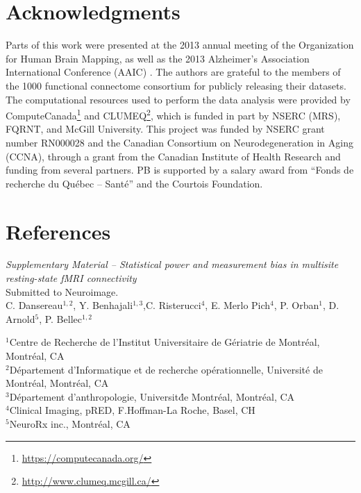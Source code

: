 \documentclass[authoryear]{elsarticle}
\begin{document}
\section{Acknowledgments}
Parts of this work were presented at the 2013 annual meeting of the Organization for Human Brain Mapping, as well as the 2013 Alzheimer's Association International Conference (AAIC) \citep{Dansereau2013b}. The authors are grateful to the members of the 1000 functional connectome consortium for publicly releasing their datasets. The computational resources used to perform the data analysis were provided by ComputeCanada\footnote{\url{https://computecanada.org/}} and CLUMEQ\footnote{\url{http://www.clumeq.mcgill.ca/}}, which is funded in part by NSERC (MRS), FQRNT, and McGill University. This project was funded by NSERC grant number RN000028 and the Canadian
Consortium on Neurodegeneration in Aging (CCNA), through a grant from
the Canadian Institute of Health Research and funding from several
partners. PB is supported by a salary award from ``Fonds de recherche du Qu\'ebec -- Sant\'e'' and the Courtois Foundation.

\section*{References}





\pagebreak



\clearpage
\appendix


\clearpage
\pagebreak
\renewcommand{\thefigure}{S\arabic{figure}}
\renewcommand{\thetable}{S\arabic{table}}
\setcounter{figure}{0}
\begin{center}
\emph{Supplementary Material {--} Statistical power and measurement bias in multisite resting-state fMRI connectivity}\\

\vspace{\baselineskip}Submitted to Neuroimage.\\

\vspace{\baselineskip}C. Dansereau$^{1,2}$,  Y. Benhajali$^{1,3}$,C. Risterucci$^{4}$, E. Merlo Pich$^{4}$, P. Orban$^{1}$, D. Arnold$^{5}$, P. Bellec$^{1,2}$\\

\end{center}

$^1$Centre de Recherche de l'Institut Universitaire de G\'eriatrie de Montr\'eal, Montr\'eal, CA\\
$^2$D\'epartement d'Informatique et de recherche op\'erationnelle, Universit\'e de Montr\'eal, Montr\'eal, CA\\
$^3$D\'epartement d'anthropologie, Universit\' de Montr\'eal, Montr\'eal, CA\\
$^4$Clinical Imaging, pRED, F.Hoffman-La Roche, Basel, CH\\
$^5$NeuroRx inc., Montr\'eal, CA\\
\end{document}
